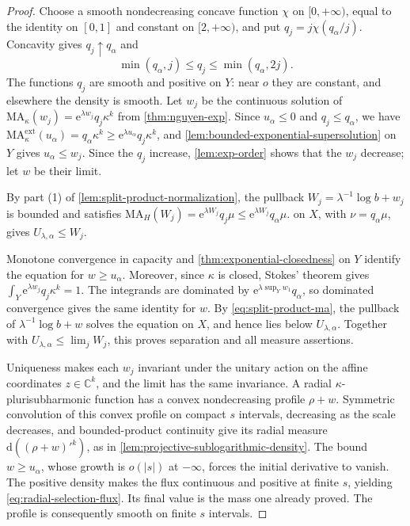 \begin{proof}
Choose a smooth nondecreasing concave function $\chi$ on $[0,+\infty)$, equal to the identity on $[0,1]$ and constant on $[2,+\infty)$, and put $q_j=j\chi(q_\alpha/j)$. Concavity gives $q_j\uparrow q_\alpha$ and
\[
 \min(q_\alpha,j)\leq q_j\leq\min(q_\alpha,2j).
\]
The functions $q_j$ are smooth and positive on $Y$: near $o$ they are constant, and elsewhere the density is smooth. Let $w_j$ be the continuous solution of $\mathrm{MA}_\kappa(w_j)=\mathrm e^{\lambda w_j}q_j\kappa^k$ from \cref{thm:nguyen-exp}. Since $u_\alpha\leq0$ and $q_j\leq q_\alpha$, we have $\mathrm{MA}^{\mathrm{ext}}_\kappa(u_\alpha)=q_\alpha\kappa^k\geq\mathrm e^{\lambda u_\alpha}q_j\kappa^k$, and \cref{lem:bounded-exponential-supersolution} on $Y$ gives $u_\alpha\leq w_j$. Since the $q_j$ increase, \cref{lem:exp-order} shows that the $w_j$ decrease; let $w$ be their limit.

By part (1) of \cref{lem:split-product-normalization}, the pullback $W_j=\lambda^{-1}\log b+w_j$ is bounded and satisfies $\mathrm{MA}_H(W_j)=\mathrm e^{\lambda W_j}q_j\mu\leq\mathrm e^{\lambda W_j}q_\alpha\mu$.  on $X$, with $\nu=q_\alpha\mu$, gives $U_{\lambda,\alpha}\leq W_j$.

Monotone convergence in capacity and \cref{thm:exponential-closedness} on $Y$ identify the equation for $w\geq u_\alpha$. Moreover, since $\kappa$ is closed, Stokes' theorem gives $\int_Y\mathrm e^{\lambda w_j}q_j\kappa^k=1$. The integrands are dominated by $\mathrm e^{\lambda\sup_Yw_1}q_\alpha$, so dominated convergence gives the same identity for $w$. By \eqref{eq:split-product-ma}, the pullback of $\lambda^{-1}\log b+w$ solves the equation on $X$, and hence lies below $U_{\lambda,\alpha}$. Together with $U_{\lambda,\alpha}\leq\lim_jW_j$, this proves separation and all measure assertions.

Uniqueness makes each $w_j$ invariant under the unitary action on the affine coordinates $z\in\mathbb C^k$, and the limit has the same invariance. A radial $\kappa$-plurisubharmonic function has a convex nondecreasing profile $\rho+w$. Symmetric convolution of this convex profile on compact $s$ intervals, decreasing as the scale decreases, and bounded-product continuity give its radial measure $\mathrm d((\rho+w)'^k)$, as in \cref{lem:projective-sublogarithmic-density}. The bound $w\geq u_\alpha$, whose growth is $o(|s|)$ at $-\infty$, forces the initial derivative to vanish. The positive density makes the flux continuous and positive at finite $s$, yielding \eqref{eq:radial-selection-flux}. Its final value is the mass one already proved. The profile is consequently smooth on finite $s$ intervals.
\end{proof}

